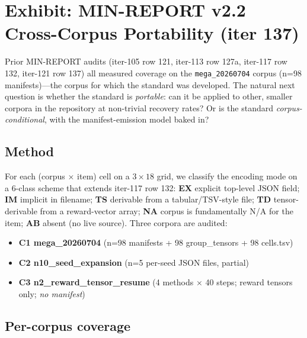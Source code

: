 \section{Exhibit: MIN-REPORT v2.2 Cross-Corpus Portability (iter 137)}
\label{sec:p5-iter137-cross-corpus}

Prior MIN-REPORT audits (iter-105 row 121, iter-113 row 127a, iter-117 row
132, iter-121 row 137) all measured coverage on the
\texttt{mega\_20260704} corpus (n=98 manifests)---the corpus for which
the standard was developed. The natural next question is whether the
standard is \emph{portable}: can it be applied to other, smaller corpora
in the repository at non-trivial recovery rates? Or is the standard
\emph{corpus-conditional}, with the manifest-emission model baked in?

\subsection*{Method}

For each (corpus $\times$ item) cell on a $3 \times 18$ grid, we classify
the encoding mode on a 6-class scheme that extends iter-117 row 132:
\textbf{EX} explicit top-level JSON field; \textbf{IM} implicit in
filename; \textbf{TS} derivable from a tabular/TSV-style file; \textbf{TD}
tensor-derivable from a reward-vector array; \textbf{NA} corpus is
fundamentally N/A for the item; \textbf{AB} absent (no live source).
Three corpora are audited:

\begin{itemize}
  \item \textbf{C1 mega\_20260704} (n=98 manifests + 98 group\_tensors + 98 cells.tsv)
  \item \textbf{C2 n10\_seed\_expansion} (n=5 per-seed JSON files, partial)
  \item \textbf{C3 n2\_reward\_tensor\_resume} (4 methods $\times$ 40 steps; reward tensors only; \emph{no manifest})
\end{itemize}

\subsection*{Per-corpus coverage}

